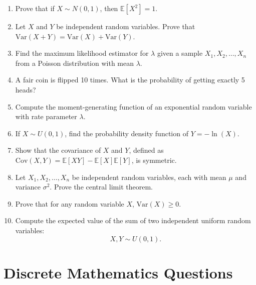 \documentclass{article}
\begin{document}
\begin{enumerate}
    \item Prove that if \( X \sim N(0, 1) \), then \( \mathbb{E}[X^2] = 1 \).

    \item Let \( X \) and \( Y \) be independent random variables. Prove that \( \text{Var}(X + Y) = \text{Var}(X) + \text{Var}(Y) \).

    \item Find the maximum likelihood estimator for \( \lambda \) given a sample \( X_1, X_2, \dots, X_n \) from a Poisson distribution with mean \( \lambda \).

    \item A fair coin is flipped 10 times. What is the probability of getting exactly 5 heads?

    \item Compute the moment-generating function of an exponential random variable with rate parameter \( \lambda \).

    \item If \( X \sim U(0, 1) \), find the probability density function of \( Y = -\ln(X) \).

    \item Show that the covariance of \( X \) and \( Y \), defined as \( \text{Cov}(X, Y) = \mathbb{E}[XY] - \mathbb{E}[X]\mathbb{E}[Y] \), is symmetric.

    \item Let \( X_1, X_2, \dots, X_n \) be independent random variables, each with mean \( \mu \) and variance \( \sigma^2 \). Prove the central limit theorem.

    \item Prove that for any random variable \( X \), \( \text{Var}(X) \geq 0 \).

    \item Compute the expected value of the sum of two independent uniform random variables:
    \[
    X, Y \sim U(0, 1).
    \]
\end{enumerate}

\section*{Discrete Mathematics Questions}
\end{document}
